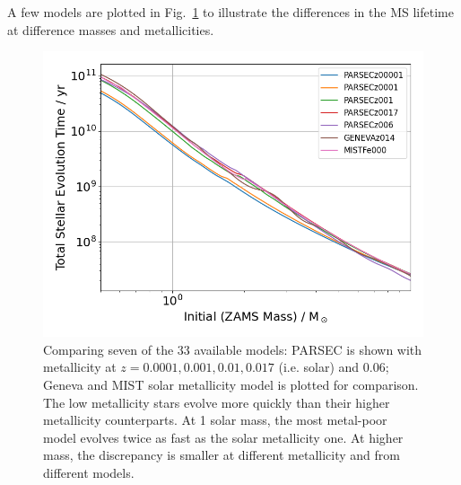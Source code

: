 \documentclass[fleqn,usenatbib]{rasti}
\begin{document}
A few models are plotted in Fig.~\ref{fig:total_stellar_lifetime} to
illustrate the differences in the MS lifetime at difference masses and
metallicities.

\begin{figure}
    \centering
    \includegraphics[width=\columnwidth]{fig_06_total_stellar_lifetime.png}
    \caption{Comparing seven of the 33 available models: PARSEC is shown with
    metallicity at $z=0.0001, 0.001, 0.01, 0.017$ (i.e. solar) and $0.06$; Geneva
    and MIST solar metallicity model is plotted for comparison. The low
    metallicity stars evolve more quickly than their higher metallicity counterparts.
    At 1 solar mass, the most metal-poor model evolves twice as fast as the
    solar metallicity one. At higher mass, the discrepancy is smaller at
    different metallicity and from different models.}
    \label{fig:total_stellar_lifetime}
\end{figure}
\end{document}
